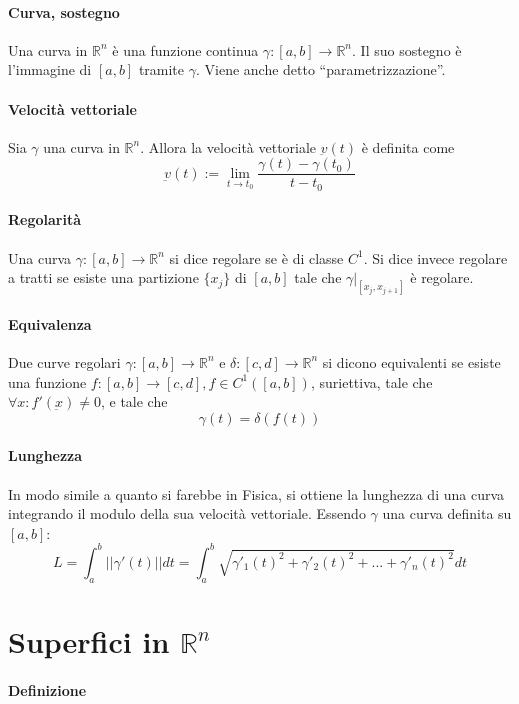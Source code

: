 \documentclass[a4paper,12pt]{article}
\begin{document}
\paragraph{Curva, sostegno}
Una curva in $\mathbb{R}^n$ è una funzione continua $\gamma:[a,b]\rightarrow\mathbb{R}^n$.
Il suo sostegno è l'immagine di $[a,b]$ tramite $\gamma$. Viene anche detto ``parametrizzazione''.
\paragraph{Velocità vettoriale}
Sia $\gamma$ una curva in $\mathbb{R}^n$. Allora la velocità vettoriale $\underbar{v}(t)$ è definita come
$$\underbar{v}(t) := \lim_{t\to t_0} \dfrac{\gamma(t)-\gamma(t_0)}{t-t_0}$$

\paragraph{Regolarità}
Una curva $\gamma:[a,b]\rightarrow\mathbb{R}^n$ si dice regolare se è di classe $C^1$. Si dice invece regolare a tratti se esiste una partizione $\{x_j\}$ di $[a,b]$ tale che $\gamma|_{[x_j, x_{j+1}]}$ è regolare.
\paragraph{Equivalenza}
Due curve regolari $\gamma :[a,b]\rightarrow\mathbb{R}^n$ e $\delta :[c,d]\rightarrow\mathbb{R}^n$ si dicono equivalenti se esiste una funzione 
$f:[a,b]\rightarrow[c,d], f \in C^1([a,b])$, suriettiva, tale che $\forall x: f'(\underbar{x}) \neq 0$, e tale che
$$\gamma(t) = \delta(f(t))$$
\paragraph{Lunghezza}
In modo simile a quanto si farebbe in Fisica, si ottiene la lunghezza di una curva integrando il modulo della sua velocità vettoriale. Essendo $\gamma$ una curva definita su $[a, b]$:
$$L= \int_a^b ||\gamma'(t)|| dt = \int_a^b\sqrt{\gamma'_1(t)^2+\gamma'_2(t)^2+...+\gamma'_n(t)^2}dt$$

\section{Superfici in $\mathbb{R}^n$}
 
\paragraph{Definizione}
\end{document}
